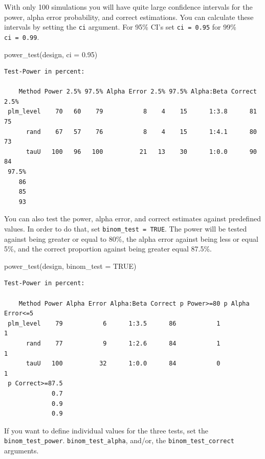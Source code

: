 \documentclass[
  letterpaper,
  DIV=11,
  numbers=noendperiod]{scrreprt}
\newenvironment{Shaded}{\begin{snugshade}}{\end{snugshade}}
\newcommand{\AttributeTok}[1]{\textcolor[rgb]{0.40,0.45,0.13}{#1}}
\newcommand{\ConstantTok}[1]{\textcolor[rgb]{0.56,0.35,0.01}{#1}}
\newcommand{\FloatTok}[1]{\textcolor[rgb]{0.68,0.00,0.00}{#1}}
\newcommand{\FunctionTok}[1]{\textcolor[rgb]{0.28,0.35,0.67}{#1}}
\newcommand{\NormalTok}[1]{\textcolor[rgb]{0.00,0.23,0.31}{#1}}
\begin{document}
With only 100 simulations you will have quite large confidence intervals
for the power, alpha error probability, and correct estimations. You can
calculate these intervals by setting the \texttt{ci} argument. For 95\%
CI's set \texttt{ci\ =\ 0.95} for 99\% \texttt{ci\ =\ 0.99}.

\begin{Shaded}
\begin{Highlighting}[]
\FunctionTok{power\_test}\NormalTok{(design, }\AttributeTok{ci =} \FloatTok{0.95}\NormalTok{)}
\end{Highlighting}
\end{Shaded}

\begin{verbatim}
Test-Power in percent:

    Method Power 2.5% 97.5% Alpha Error 2.5% 97.5% Alpha:Beta Correct 2.5%
 plm_level    70   60    79           8    4    15      1:3.8      81   75
      rand    67   57    76           8    4    15      1:4.1      80   73
      tauU   100   96   100          21   13    30      1:0.0      90   84
 97.5%
    86
    85
    93
\end{verbatim}

You can also test the power, alpha error, and correct estimates against
predefined values. In order to do that, set
\texttt{binom\_test\ =\ TRUE}. The power will be tested against being
greater or equal to 80\%, the alpha error against being less or equal
5\%, and the correct proportion against being greater equal 87.5\%.

\begin{Shaded}
\begin{Highlighting}[]
\FunctionTok{power\_test}\NormalTok{(design, }\AttributeTok{binom\_test =} \ConstantTok{TRUE}\NormalTok{)}
\end{Highlighting}
\end{Shaded}

\begin{verbatim}
Test-Power in percent:

    Method Power Alpha Error Alpha:Beta Correct p Power>=80 p Alpha Error<=5
 plm_level    79           6      1:3.5      86           1                1
      rand    77           9      1:2.6      84           1                1
      tauU   100          32      1:0.0      84           0                1
 p Correct>=87.5
             0.7
             0.9
             0.9
\end{verbatim}

If you want to define individual values for the three tests, set the
\texttt{binom\_test\_power}. \texttt{binom\_test\_alpha}, and/or, the
\texttt{binom\_test\_correct} arguments.
\end{document}
